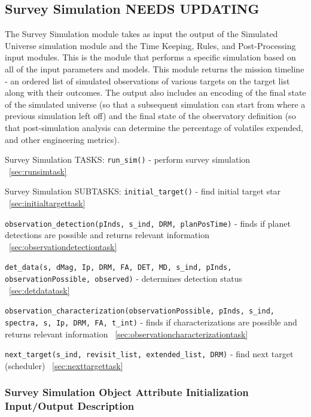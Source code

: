 \documentclass[cleanfoot]{asme2ej}
\begin{document}
\subsection{Survey Simulation NEEDS UPDATING} \label{sec:surveysim}
The Survey Simulation module takes as input the output of the Simulated Universe simulation module and the Time Keeping, Rules, and Post-Processing input modules. This is the module that performs a specific simulation based on all of the input parameters and models. This module returns the mission timeline - an ordered list of simulated observations of various targets on the target list along with their outcomes.  The output also includes an encoding of the final state of the simulated universe (so that a subsequent simulation can start from where a previous simulation left off) and the final state of the observatory definition (so that post-simulation analysis can determine the percentage of volatiles expended, and other engineering metrics).

Survey Simulation TASKS: 
\verb+run_sim()+ - perform survey simulation ~\ref{sec:runsimtask}

Survey Simulation SUBTASKS:
\verb+initial_target()+ - find initial target star ~\ref{sec:initialtargettask}

\verb+observation_detection(pInds, s_ind, DRM, planPosTime)+ - finds if planet detections are possible and returns relevant information ~\ref{sec:observationdetectiontask}

\verb+det_data(s, dMag, Ip, DRM, FA, DET, MD, s_ind, pInds, observationPossible, observed)+ - determines detection status ~\ref{sec:detdatatask}

\verb+observation_characterization(observationPossible, pInds, s_ind, spectra, s, Ip, DRM, FA, t_int)+ - finds if characterizations are possible and returns relevant information ~\ref{sec:observationcharacterizationtask}

\verb+next_target(s_ind, revisit_list, extended_list, DRM)+ - find next target (scheduler) ~\ref{sec:nexttargettask}

\subsubsection{Survey Simulation Object Attribute Initialization Input/Output Description}
\end{document}
